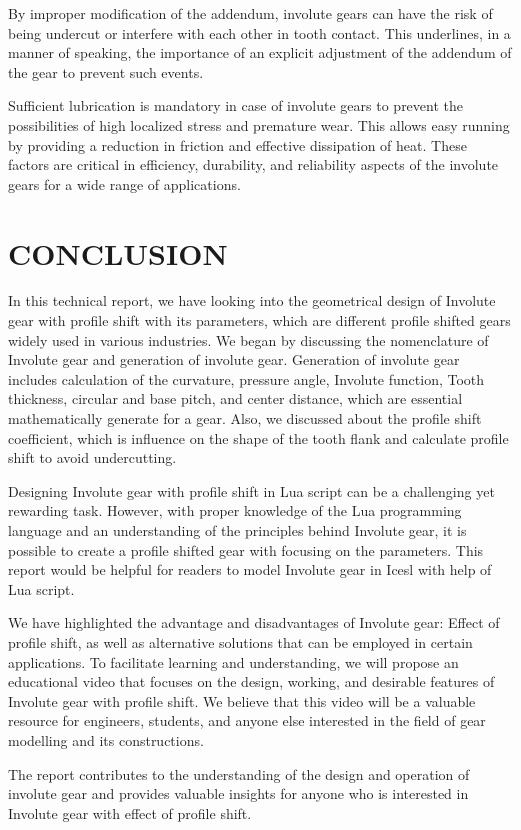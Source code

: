 \documentclass{article}
\begin{document}
By improper modification of the addendum, involute gears can have the risk of being undercut or interfere with each other in tooth contact. This underlines, in a manner of speaking, the importance of an explicit adjustment of the addendum of the gear to prevent such events.

Sufficient lubrication is mandatory in case of involute gears to prevent the possibilities of high localized stress and premature wear. This allows easy running by providing a reduction in friction and effective dissipation of heat. These factors are critical in efficiency, durability, and reliability aspects of the involute gears for a wide range of applications.
\newpage
\section{CONCLUSION}

In this technical report, we have looking into the geometrical design of Involute gear with profile shift with its parameters, which are different profile shifted gears widely used in various industries. We began by discussing the nomenclature of Involute gear and generation of involute gear. Generation of involute gear includes calculation of the curvature, pressure angle, Involute function, Tooth thickness, circular and base pitch, and center distance, which are essential mathematically generate for a gear. Also, we discussed about the profile shift coefficient, which is influence on the shape of the tooth flank and calculate profile shift to avoid undercutting.

Designing Involute gear with profile shift in Lua script can be a challenging yet rewarding task. However, with proper knowledge of the Lua programming language and an understanding of the principles behind Involute gear, it is possible to create a profile shifted gear with focusing on the parameters. This report would be helpful for readers to model Involute gear in Icesl with help of Lua script. 

We have highlighted the advantage and disadvantages of Involute gear: Effect of profile shift, as well as alternative solutions that can be employed in certain applications. To facilitate learning and understanding, we will propose an educational video that focuses on the design, working, and desirable features of Involute gear with profile shift. We believe that this video will be a valuable resource for engineers, students, and anyone else interested in the field of gear modelling and its constructions.

The report contributes to the understanding of the design and operation of involute gear and provides valuable insights for anyone who is interested in Involute gear with effect of profile shift.

\newpage


\end{document}
